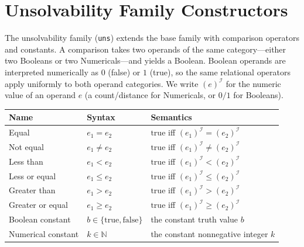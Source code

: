 \documentclass[11pt]{article}
\newcommand{\I}{\mathcal{I}}
\newcommand{\sem}[1]{\left(#1\right)^{\I}}
\newcommand{\Nat}{\mathbb{N}}
\newenvironment{compacttable}
  {\begingroup\setlength{\tabcolsep}{3pt}}
  {\endgroup}
\begin{document}
\section{Unsolvability Family Constructors}

The unsolvability family (\texttt{uns}) extends the base family with comparison operators and
constants. A comparison takes two operands of the same category---either two Booleans or two
Numericals---and yields a Boolean. Boolean operands are interpreted numerically as $0$ (false) or
$1$ (true), so the same relational operators apply uniformly to both operand categories. We write
$\sem{e}$ for the numeric value of an operand $e$ (a count/distance for Numericals,
or $0/1$ for Booleans).

\begin{compacttable}
\begin{longtable}{>{\raggedright\arraybackslash}p{}
                  >{\centering\arraybackslash}p{}
                  >{\raggedright\arraybackslash}p{}}
\toprule
Name & Syntax & Semantics \\
\midrule
\endhead

Equal &
$e_1 = e_2$ &
$\mathrm{true}$ iff $\sem{e_1} = \sem{e_2}$ \\

Not equal &
$e_1 \neq e_2$ &
$\mathrm{true}$ iff $\sem{e_1} \neq \sem{e_2}$ \\

Less than &
$e_1 < e_2$ &
$\mathrm{true}$ iff $\sem{e_1} < \sem{e_2}$ \\

Less or equal &
$e_1 \leq e_2$ &
$\mathrm{true}$ iff $\sem{e_1} \leq \sem{e_2}$ \\

Greater than &
$e_1 > e_2$ &
$\mathrm{true}$ iff $\sem{e_1} > \sem{e_2}$ \\

Greater or equal &
$e_1 \geq e_2$ &
$\mathrm{true}$ iff $\sem{e_1} \geq \sem{e_2}$ \\

Boolean constant &
$b \in \{\mathrm{true}, \mathrm{false}\}$ &
the constant truth value $b$ \\

Numerical constant &
$k \in \Nat$ &
the constant nonnegative integer $k$ \\

\bottomrule
\end{longtable}
\end{compacttable}
\end{document}

